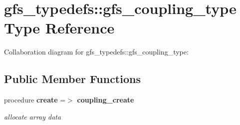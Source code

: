 \section{gfs\+\_\+typedefs\+:\+:gfs\+\_\+coupling\+\_\+type Type Reference}
\label{structgfs__typedefs_1_1gfs__coupling__type}


Collaboration diagram for gfs\+\_\+typedefs\+:\+:gfs\+\_\+coupling\+\_\+type\+:
\subsection*{Public Member Functions}
\begin{DoxyCompactItemize}
\item 
procedure \textbf{ create} =$>$ \textbf{ coupling\+\_\+create}
\begin{DoxyCompactList}\small\item\em allocate array data \end{DoxyCompactList}\end{DoxyCompactItemize}
